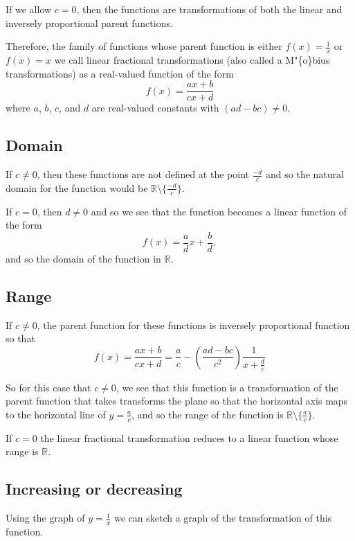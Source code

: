 \documentclass[
]{book}
\theoremstyle{definition}
\theoremstyle{definition}
\theoremstyle{definition}
\theoremstyle{definition}
\theoremstyle{remark}
\begin{document}
If we allow \(c=0\), then the functions are transformations of both the linear and inversely proportional parent functions.

Therefore, the family of functions whose parent function is either \(f(x)=\frac{1}{x}\) or \(f(x)=x\) we call linear fractional transformations (also called a M"\{o\}bius transformations) as a real-valued function of the form \[f(x)=\frac{ax+b}{cx+d}\] where \(a\), \(b\), \(c\), and \(d\) are real-valued constants with \((ad-bc)\neq 0\).

\hypertarget{domain}{%
\subsection{Domain}\label{domain}}

If \(c\neq 0\), then these functions are not defined at the point \(\frac{-d}{c}\) and so the natural domain for the function would be \(\mathbb{R}\setminus \{\frac{-d}{c}\}\).

If \(c=0\), then \(d\neq 0\) and so we see that the function becomes a linear function of the form
\[f(x)= \frac{a}{d} x + \frac{b}{d},\] and so the domain of the function in \(\mathbb{R}\).

\hypertarget{range}{%
\subsection{Range}\label{range}}

If \(c\neq 0\), the parent function for these functions is inversely proportional function so that
\[f(x)=\frac{ax+b}{cx+d} = \frac{a}{c} -\left(\frac{ad-bc}{c^2}\right)\frac{1}{x+\frac{d}{c}}\]

So for this case that \(c\neq 0\), we see that this function is a transformation of the parent function that takes transforms the plane so that the horizontal axis maps to the horizontal line of \(y=\frac{a}{c}\), and so the range of the function is \(\mathbb{R}\setminus \{\frac{a}{c}\}\).

If \(c=0\) the linear fractional transformation reduces to a linear function whose range is \(\mathbb{R}\).

\hypertarget{increasing-or-decreasing-1}{%
\subsection{Increasing or decreasing}\label{increasing-or-decreasing-1}}

Using the graph of \(y=\frac{1}{x}\) we can sketch a graph of the transformation of this function.
\end{document}
